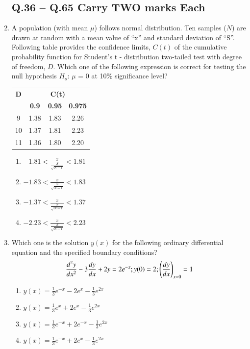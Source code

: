 \documentclass[journal]{IEEEtran}
\begin{document}
\begin{enumerate}
\subsection*{Q.36 -- Q.65 Carry TWO marks Each}

\item A population (with mean $\mu$) follows normal distribution. Ten samples ($N$) are drawn at random with a mean value of ``x'' and standard deviation of ``S''. Following table provides the confidence limits, $C(t)$ of the cumulative probability function for Student's t - distribution two-tailed test with degree of freedom, $D$. Which one of the following expression is correct for testing the null hypothesis $H_o$: $\mu$ = 0 at 10\% significance level?
\hfill{}
\begin{table}[H]
\centering
\begin{tabular}{|c|c|c|c|}
\hline
\textbf{D} & \multicolumn{3}{c|}{\textbf{C(t)}} \\
\cline{2-4}
& \textbf{0.9} & \textbf{0.95} & \textbf{0.975} \\
\hline
9 & 1.38 & 1.83 & 2.26 \\
\hline
10 & 1.37 & 1.81 & 2.23 \\
\hline
11 & 1.36 & 1.80 & 2.20 \\
\hline
\end{tabular}
\end{table}
\begin{enumerate}
\item $-1.81 < \frac{x}{\frac{S}{\sqrt{N-1}}} < 1.81$
\item $-1.83 < \frac{x}{\frac{S}{\sqrt{N-1}}} < 1.83$
\item $-1.37 < \frac{x}{\frac{S}{\sqrt{N-1}}} < 1.37$
\item $-2.23 < \frac{x}{\frac{S}{\sqrt{N-1}}} < 2.23$
\end{enumerate}

\item Which one is the solution $y(x)$ for the following ordinary differential equation and the specified boundary conditions? \\
\begin{align*}
\frac{d^2y}{dx^2} - 3\frac{dy}{dx} + 2y = 2e^{-x}; y(0) = 2; \left(\frac{dy}{dx}\right)_{x=0} = 1
\end{align*}

\hfill{}
\begin{enumerate}
\item $y(x) = \frac{1}{3}e^{-x} - 2e^{x} - \frac{1}{3}e^{2x}$
\item $y(x) = \frac{1}{3}e^{x} + 2e^{x} - \frac{1}{3}e^{2x}$
\item $y(x) = \frac{1}{3}e^{-x} + 2e^{-x} - \frac{1}{3}e^{2x}$
\item $y(x) = \frac{1}{3}e^{-x} + 2e^{x} - \frac{1}{3}e^{2x}$
\end{enumerate}


\end{enumerate}
\end{document}
